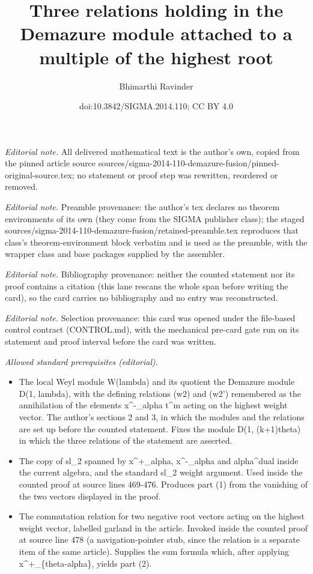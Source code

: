 \documentclass[10pt,a4paper]{amsart}
\title{Three relations holding in the Demazure module attached to a multiple of the highest root}
\author{Bhimarthi Ravinder}
\date{doi:10.3842/SIGMA.2014.110; CC BY 4.0}
\begin{document}
\maketitle
\noindent\textit{Editorial note.} All delivered mathematical text is the author's own, copied from the pinned article source sources/sigma-2014-110-demazure-fusion/pinned-original-source.tex; no statement or proof step was rewritten, reordered or removed.\par\medskip
\noindent\textit{Editorial note.} Preamble provenance: the author's tex declares no theorem environments of its own (they come from the SIGMA publisher class); the staged sources/sigma-2014-110-demazure-fusion/retained-preamble.tex reproduces that class's theorem-environment block verbatim and is used as the preamble, with the wrapper class and base packages supplied by the assembler.\par\medskip
\noindent\textit{Editorial note.} Bibliography provenance: neither the counted statement nor its proof contains a citation (this lane rescans the whole span before writing the card), so the card carries no bibliography and no entry was reconstructed.\par\medskip
\noindent\textit{Editorial note.} Selection provenance: this card was opened under the file-based control contract (CONTROL.md), with the mechanical pre-card gate run on its statement and proof interval before the card was written.\par\medskip
\noindent\textit{Allowed standard prerequisites (editorial).}\begin{itemize}
\item The local Weyl module W(lambda) and its quotient the Demazure module D(1, lambda), with the defining relations (w2) and (w2') remembered as the annihilation of the elements x\textasciicircum{}-\_alpha t\textasciicircum{}m acting on the highest weight vector. The author's sections 2 and 3, in which the modules and the relations are set up before the counted statement. Fixes the module D(1, (k+1)theta) in which the three relations of the statement are asserted.
\item The copy of sl\_2 spanned by x\textasciicircum{}+\_alpha, x\textasciicircum{}-\_alpha and alpha\textasciicircum{}dual inside the current algebra, and the standard sl\_2 weight argument. Used inside the counted proof at source lines 469-476. Produces part (1) from the vanishing of the two vectors displayed in the proof.
\item The commutation relation for two negative root vectors acting on the highest weight vector, labelled garland in the article. Invoked inside the counted proof at source line 478 (a navigation-pointer stub, since the relation is a separate item of the same article). Supplies the sum formula which, after applying x\textasciicircum{}+\_\{theta-alpha\}, yields part (2).
\end{itemize}\medskip
\end{document}
